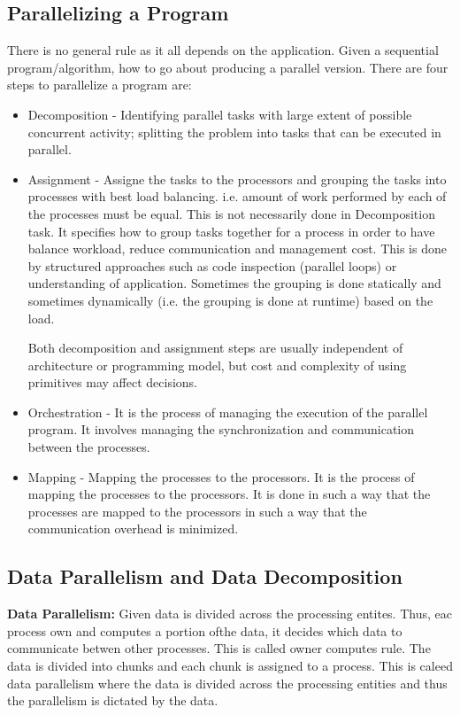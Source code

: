 \documentclass[12pt]{article}
\begin{document}
\subsection{Parallelizing a Program}
There is no general rule as it all depends on the application. Given a sequential program/algorithm, how to go about producing a parallel version. There are four steps to parallelize a program are:
\begin{itemize}
    \item Decomposition - Identifying parallel tasks with large extent of possible concurrent activity; splitting the problem into tasks that can be executed in parallel.
    \item Assignment - Assigne the tasks to the processors and grouping the tasks into processes with best load balancing. i.e. amount of work performed by each of the processes must be equal.
    This is not necessarily done in Decomposition task. It specifies how to group tasks together for a process in order to have balance workload, reduce communication and management cost.
    This is done by structured approaches such as code inspection (parallel loops) or understanding of application. Sometimes the grouping is done statically and sometimes dynamically (i.e. the grouping is done at runtime) based on the load.

    Both decomposition and assignment steps are usually independent of architecture or programming model, but cost and complexity of using primitives may affect decisions.
    \item Orchestration - It is the process of managing the execution of the parallel program. It involves managing the synchronization and communication between the processes. 
    \item Mapping - Mapping the processes to the processors. It is the process of mapping the processes to the processors. It is done in such a way that the processes are mapped to the processors in such a way that the communication overhead is minimized.
\end{itemize}
\subsection{Data Parallelism and Data Decomposition}
\textbf{Data Parallelism: }Given data is divided across the processing entites. Thus, eac process own and computes a portion ofthe data, it decides which data to communicate betwen other processes.
This is called owner computes rule. The data is divided into chunks and each chunk is assigned to a process. This is caleed data parallelism where the data is divided across the processing entities and thus the parallelism is dictated by the data. 
\end{document}
